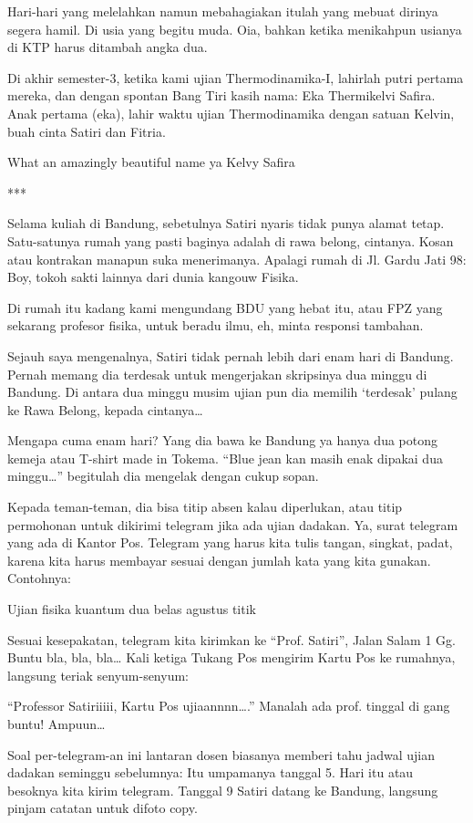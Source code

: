 Hari-hari yang melelahkan namun mebahagiakan itulah yang mebuat dirinya segera hamil. Di usia yang begitu muda. Oia, bahkan ketika menikahpun usianya di KTP harus ditambah angka dua.

Di akhir semester-3, ketika kami ujian Thermodinamika-I, lahirlah putri pertama mereka, dan dengan spontan Bang Tiri kasih nama: Eka Thermikelvi Safira. Anak pertama (eka), lahir waktu ujian Thermodinamika dengan satuan Kelvin, buah cinta Satiri dan Fitria.

What an amazingly beautiful name ya Kelvy Safira

***

Selama kuliah di Bandung, sebetulnya Satiri nyaris tidak punya alamat tetap. Satu-satunya rumah yang pasti baginya adalah di rawa belong, cintanya. Kosan atau kontrakan manapun suka menerimanya. Apalagi rumah di Jl. Gardu Jati 98: Boy, tokoh sakti lainnya dari dunia kangouw Fisika.

Di rumah itu kadang kami mengundang BDU yang hebat itu, atau FPZ yang sekarang profesor fisika, untuk beradu ilmu, eh, minta responsi tambahan.

Sejauh saya mengenalnya, Satiri tidak pernah lebih dari enam hari di Bandung. Pernah memang dia terdesak untuk mengerjakan skripsinya dua minggu di Bandung. Di antara dua minggu musim ujian pun dia memilih ‘terdesak’ pulang ke Rawa Belong, kepada cintanya…

Mengapa cuma enam hari? Yang dia bawa ke Bandung ya hanya dua potong kemeja atau T-shirt made in Tokema. “Blue jean kan masih enak dipakai dua minggu…” begitulah dia mengelak dengan cukup sopan.

Kepada teman-teman, dia bisa titip absen kalau diperlukan, atau titip permohonan untuk dikirimi telegram jika ada ujian dadakan. Ya, surat telegram yang ada di Kantor Pos. Telegram yang harus kita tulis tangan, singkat, padat, karena kita harus membayar sesuai dengan jumlah kata yang kita gunakan. Contohnya:

Ujian fisika kuantum dua belas agustus titik

Sesuai kesepakatan, telegram kita kirimkan ke “Prof. Satiri”, Jalan Salam 1 Gg. Buntu bla, bla, bla… Kali ketiga Tukang Pos mengirim Kartu Pos ke rumahnya, langsung teriak senyum-senyum:

“Professor Satiriiiii, Kartu Pos ujiaannnn….” Manalah ada prof. tinggal di gang buntu! Ampuun…

Soal per-telegram-an ini lantaran dosen biasanya memberi tahu jadwal ujian dadakan seminggu sebelumnya: Itu umpamanya tanggal 5. Hari itu atau besoknya kita kirim telegram. Tanggal 9 Satiri datang ke Bandung, langsung pinjam catatan untuk difoto copy.

